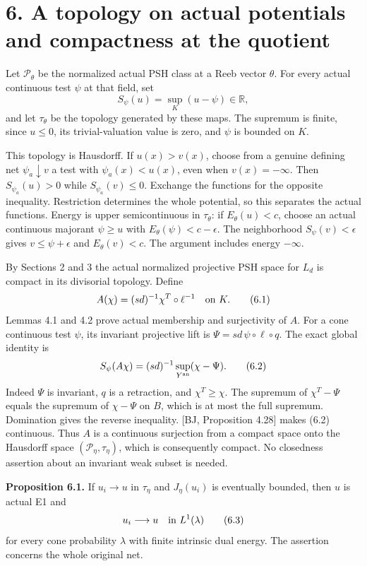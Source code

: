 \documentclass[
  10pt,
]{article}
\begin{document}
\section{6. A topology on actual potentials and compactness at the
quotient}\label{a-topology-on-actual-potentials-and-compactness-at-the-quotient}

Let \(\mathcal P_\theta\) be the normalized actual PSH class at a Reeb
vector \(\theta\). For every actual continuous test \(\psi\) at that
field, set \[
              S_\psi(u)=\sup_K(u-\psi)\in\mathbb R,
\] and let \(\tau_\theta\) be the topology generated by these maps. The
supremum is finite, since \(u\leq0\), its trivial-valuation value is
zero, and \(\psi\) is bounded on \(K\).

This topology is Hausdorff. If \(u(x)>v(x)\), choose from a genuine
defining net \(\psi_a\downarrow v\) a test with \(\psi_a(x)<u(x)\), even
when \(v(x)=-\infty\). Then \(S_{\psi_a}(u)>0\) while
\(S_{\psi_a}(v)\leq0\). Exchange the functions for the opposite
inequality. Restriction determines the whole potential, so this
separates the actual functions. Energy is upper semicontinuous in
\(\tau_\theta\): if \(E_\theta(u)<c\), choose an actual continuous
majorant \(\psi\geq u\) with \(E_\theta(\psi)<c-\epsilon\). The
neighborhood \(S_\psi(v)<\epsilon\) gives \(v\leq\psi+\epsilon\) and
\(E_\theta(v)<c\). The argument includes energy \(-\infty\).

By Sections 2 and 3 the actual normalized projective PSH space for
\(L_d\) is compact in its divisorial topology. Define \[
 A(\chi)=(sd)^{-1}\chi^T\circ\ell^{-1}\quad\hbox{on }K.         \tag{6.1}
\] Lemmas 4.1 and 4.2 prove actual membership and surjectivity of \(A\).
For a cone continuous test \(\psi\), its invariant projective lift is
\(\Psi=sd\,\psi\circ\ell\circ q\). The exact global identity is \[
 S_\psi(A\chi)=(sd)^{-1}\sup_{Y^{\rm an}}(\chi-\Psi).           \tag{6.2}
\] Indeed \(\Psi\) is invariant, \(q\) is a retraction, and
\(\chi^T\geq\chi\). The supremum of \(\chi^T-\Psi\) equals the supremum
of \(\chi-\Psi\) on \(B\), which is at most the full supremum.
Domination gives the reverse inequality. {[}BJ, Proposition 4.28{]}
makes (6.2) continuous. Thus \(A\) is a continuous surjection from a
compact space onto the Hausdorff space \((\mathcal P_\eta,\tau_\eta)\),
which is consequently compact. No closedness assertion about an
invariant weak subset is needed.

\textbf{Proposition 6.1.} If \(u_i\to u\) in \(\tau_\eta\) and
\(J_\eta(u_i)\) is eventually bounded, then \(u\) is actual E1 and \[
                  u_i\longrightarrow u\quad\hbox{in }L^1(\lambda)
                                                               \tag{6.3}
\] for every cone probability \(\lambda\) with finite intrinsic dual
energy. The assertion concerns the whole original net.
\end{document}
